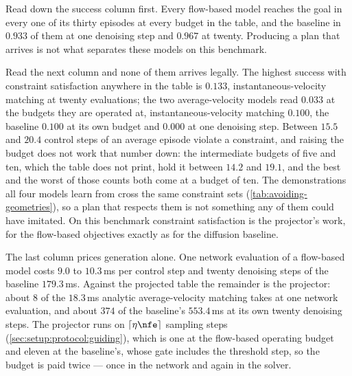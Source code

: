 Read down the success column first. Every flow-based model reaches the goal in every one of its thirty
episodes at every budget in the table, and the baseline in $0.933$ of them at one denoising step and
$0.967$ at twenty. Producing a plan that arrives is not what separates these models on this benchmark.

Read the next column and none of them arrives legally. The highest success with constraint satisfaction
anywhere in the table is $0.133$, instantaneous-velocity matching at twenty evaluations; the two
average-velocity models read $0.033$ at the budgets they are operated at, instantaneous-velocity
matching $0.100$, the baseline $0.100$ at its own budget and $0.000$ at one denoising step. Between
$15.5$ and $20.4$ control steps of an average episode violate a constraint, and raising the budget does
not work that number down: the intermediate budgets of five and ten, which the table does not print,
hold it between $14.2$ and $19.1$, and the best and the worst of those counts both come at a budget of ten.
The demonstrations all four models learn from cross the
same constraint sets (\autoref{tab:avoiding-geometries}), so a plan that respects them is not something
any of them could have imitated. On this benchmark constraint satisfaction is the projector's work, for
the flow-based objectives exactly as for the diffusion baseline.

The last column prices generation alone. One network evaluation of a flow-based model costs $9.0$ to
$10.3$\,ms per control step and twenty denoising steps of the baseline $179.3$\,ms. Against the projected
table the remainder is the projector: about $8$ of the $18.3$\,ms analytic average-velocity matching
takes at one network evaluation, and about $374$ of the baseline's $553.4$\,ms at its own twenty
denoising steps. The projector runs on
$\lceil \eta\nfe \rceil$ sampling steps (\autoref{sec:setup:protocol:guiding}), which is one at the
flow-based operating budget and eleven at the baseline's, whose gate includes the threshold step, so the
budget is paid twice --- once in the network and again in the solver.

\FloatBarrier

